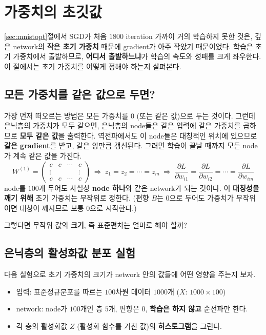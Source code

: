\documentclass[11pt,a4paper]{article}
\newcommand{\pd}[2]{\frac{\partial #1}{\partial #2}}
\begin{document}
\section{가중치의 초깃값}\label{sec:init}

\ref{sec:mnistopt}절에서 SGD가 처음 $1800$ iteration 가까이 거의 학습하지 못한 것은,
깊은 network의 \textbf{작은 초기 가중치} 때문에 gradient가 아주 작았기 때문이었다.
학습은 초기 가중치에서 출발하므로, \textbf{어디서 출발하느냐}가 학습의 속도와 성패를 크게 좌우한다.
이 절에서는 초기 가중치를 어떻게 정해야 하는지 살펴본다.

\subsection{모든 가중치를 같은 값으로 두면?}

가장 먼저 떠오르는 방법은 모든 가중치를 $0$ (또는 같은 값)으로 두는 것이다.
그런데 은닉층의 가중치가 모두 같으면, 은닉층의 node들은 같은 입력에 같은 가중치를 곱하므로
\textbf{모두 같은 값}을 출력한다.
역전파에서도 이 node들은 대칭적인 위치에 있으므로 \textbf{같은 gradient}를 받고,
같은 양만큼 갱신된다. 그러면 학습이 끝날 때까지 모든 node가 계속 같은 값을 가진다.
\[
W^{(1)}=\begin{pmatrix}c&c&\cdots&c\\ \vdots&&&\vdots\\ c&c&\cdots&c\end{pmatrix}
\ \Longrightarrow\
z_1=z_2=\cdots=z_m
\ \Longrightarrow\
\pd{L}{w_{i1}}=\pd{L}{w_{i2}}=\cdots=\pd{L}{w_{im}}
\]
node를 $100$개 두어도 사실상 \textbf{node 하나}와 같은 network가 되는 것이다.
이 \textbf{대칭성을 깨기 위해} 초기 가중치는 무작위로 정한다.
(편향 $B$는 $0$으로 두어도 가중치가 무작위이면 대칭이 깨지므로 보통 $0$으로 시작한다.)

그렇다면 무작위 값의 \textbf{크기}, 즉 표준편차는 얼마로 해야 할까?

\subsection{은닉층의 활성화값 분포 실험}

다음 실험으로 초기 가중치의 크기가 network 안의 값들에 어떤 영향을 주는지 보자.
\begin{itemize}[leftmargin=1.8em]
\item 입력: 표준정규분포를 따르는 $100$차원 데이터 $1000$개 ($X$: $1000\times100$)
\item network: node가 $100$개인 층 $5$개, 편향은 $0$, \textbf{학습은 하지 않고} 순전파만 한다.
\item 각 층의 활성화값 $Z$ (활성화 함수를 거친 값)의 \textbf{히스토그램}을 그린다.
\end{itemize}
\end{document}
